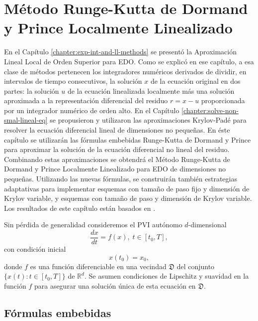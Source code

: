 \chapter{Método Runge-Kutta de Dormand y Prince Localmente Linealizado}\label{chapter:lldp}

En el Capítulo \ref{chapter:exp-int-and-ll-methods} se presentó la Aproximación Lineal Local de Orden Superior para EDO. Como se explicó en ese capítulo, a esa clase de métodos pertenecen los integradores numéricos derivados de dividir, en intervalos de tiempo consecutivos, la solución $x$ de la ecuación original en dos partes: la solución $u$ de la ecuación linealizada localmente más una solución aproximada a la representación diferencial del residuo $r=x-u$ proporcionada por un integrador numérico de orden alto. En el Capítulo \ref{chapter:solve-non-smal-lineal-eq} se propusieron y utilizaron las aproximaciones Krylov-Padé para resolver la ecuación diferencial lineal de dimensiones no pequeñas. En éste capítulo se utilizarán las fórmulas embebidas Runge-Kutta de Dormand y Prince para aproximar la solución de la ecuación diferencial no lineal del residuo. Combinando estas aproximaciones se obtendrá el Método Runge-Kutta de Dormand y Prince Localmente Linealizado para EDO de dimensiones no pequeñas. Utilizando las nuevas fórmulas, se construirán también estrategias adaptativas para implementar esquemas con tamaño de paso fijo y dimensión de Krylov variable, y esquemas con tamaño de paso y dimensión de Krylov variable. Los resultados de este capítulo están basados en \cite{naranjo2021locally}.

Sin pérdida de generalidad consideremos el PVI autónomo $d$-dimensional
\begin{equation}\label{syst}
\frac{dx}{dt}=f(x), \; t\in[t_0,T],\end{equation}
con condición inicial
\begin{equation}\label{systcond}
x(t_0)=x_0,
\end{equation}donde $f$ es una función diferenciable en una vecindad
$\mathfrak{D}$ del conjunto $\{x(t):t\in [t_0,T]\}$ de $\mathbb{R}^{d}$. Se asumen condiciones de Lipschitz y suavidad en la función $f$ para asegurar una solución única de esta ecuación en $\mathfrak{D}$.

\section{Fórmulas embebidas}

